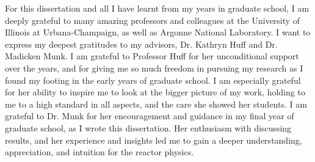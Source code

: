 For this dissertation and all I have learnt from my years in graduate school, 
I am deeply grateful to many amazing professors and colleagues at the University of 
Illinois at Urbana-Champaign, as well as Argonne National Laboratory. 
I want to express my deepest gratitudes to my advisors, Dr. Kathryn Huff and Dr. 
Madicken Munk. 
I am grateful to Professor Huff for her unconditional support over the years, and for 
giving me so much freedom in pursuing my research as I found my footing in the early 
years of graduate school. 
I am especially grateful for her ability to inspire me to look at the bigger picture of 
my work, holding to me to a high standard in all aspects, and the care she showed 
her students. 
I am grateful to Dr. Munk for her encouragement and guidance in my final year 
of graduate school, as I wrote this dissertation. 
Her enthusiasm with discussing results, and her experience and insights led me to 
gain a deeper understanding, appreciation, and intuition for the reactor physics.  








